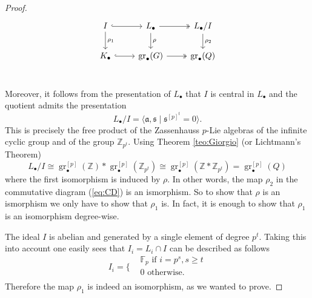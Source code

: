 \documentclass[10pt, oneside]{amsart}
\newcommand{\Z}{\mathbb{Z}} %
\newcommand{\F}{\mathbb{F}}
\newcommand{\gr}{\operatorname{gr}} %
\theoremstyle{definition}
\theoremstyle{remark}
\theoremstyle{plain}
\begin{document}
\begin{proof}
\begin{equation}\label{eq:CD}
\begin{tikzcd}
        I \arrow[r, hook]\arrow[d,"\rho_1"] &L_\bullet \arrow[r,two heads]\arrow[d,"\rho"] &L_\bullet/I\arrow[d,"\rho_2"] \\
       K_\bullet \arrow[r, hook]&\gr_\bullet(G) \arrow[r,two heads]&\gr_\bullet(Q)\\
    \end{tikzcd}
\end{equation}

Moreover, it follows from the presentation of $L_\bullet$ that $I$ is central in $L_\bullet$ and the quotient admits the presentation
$$L_\bullet/I=\langle \mathfrak{a}, \mathfrak{s}\mid \mathfrak{s}^{[p]^t}=0\rangle.$$ 
This is precisely the free product of the Zassenhauss $p$-Lie algebras of the infinite cyclic group and of the group $\Z_{p^t}$. 
Using Theorem \ref{teo:Giorgio} (or Lichtmann's Theorem)
$$L_\bullet/I\cong\gr_\bullet^{[p]}(\Z)\ast\gr_\bullet^{[p]}(\Z_{p^t})\cong\gr_\bullet^{[p]}(\Z\ast\Z_{p^t})=\gr_\bullet^{[p]}(Q)$$
where the first isomorphism is induced by $\rho$. In other words, the map $\rho_2$ in the commutative diagram (\ref{eq:CD}) is an ismorphism. So to show that $\rho$ is an ismorphism we only have to show that  $\rho_1$ is. In fact, it is enough to show that $\rho_1$ is an isomorphism degree-wise.

The ideal $I$ is abelian and generated by a single element of  degree $p^t$. Taking this into account one easily sees that $I_i=L_i\cap I$ can be described as follows
$$I_i=\Bigg\{
\begin{aligned}
&\F_p\text{ if }i=p^s,s\geq t\\
&0\text{ otherwise}.\\
\end{aligned}$$
Therefore the map $\rho_1$ is indeed an isomorphism, as we wanted to prove.
 \end{proof}
 
\end{document}
